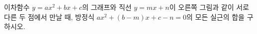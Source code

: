 \noindent\begin{minipage}[t]{0.58\linewidth}\vspace{0pt}\raggedright 이차함수 $y=ax^2+bx+c$의 그래프와 직선 $y=mx+n$이 오른쪽 그림과 같이 서로 다른 두 점에서 만날 때, 방정식 $ax^2+(b-m)x+c-n=0$의 모든 실근의 합을 구하시오. \end{minipage}\hfill\begin{minipage}[t]{0.4\linewidth}\vspace{0pt}\centering \resizebox{\ifdim\width>\linewidth\linewidth\else\width\fi}{!}{}\end{minipage}\par
